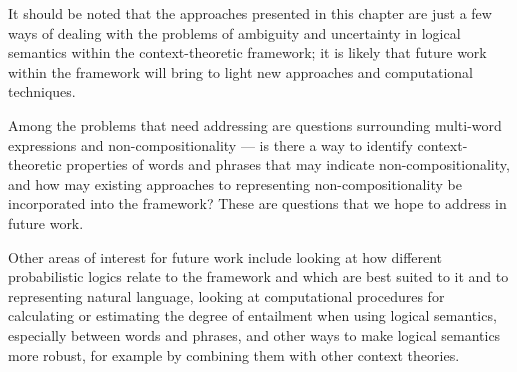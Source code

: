 It should be noted that the approaches presented in this chapter are just a few ways of dealing with the problems of ambiguity and uncertainty in logical semantics within the context-theoretic framework; it is likely that future work within the framework will bring to light new approaches and computational techniques.

Among the problems that need addressing are questions surrounding multi-word expressions and non-compositionality --- is there a way to identify context-theoretic properties of words and phrases that may indicate non-compositionality, and how may existing approaches to representing non-compositionality be incorporated into the framework? These are questions that we hope to address in future work.

Other areas of interest for future work include looking at how different probabilistic logics relate to the framework and which are best suited to it and to representing natural language, looking at computational procedures for calculating or estimating the degree of entailment when using logical semantics, especially between words and phrases, and other ways to make logical semantics more robust, for example by combining them with other context theories.





